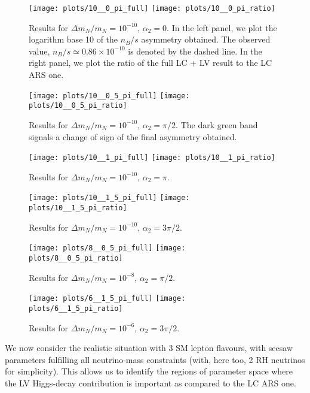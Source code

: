 \documentclass[prd,twocolumn,superscriptaddress,preprintnumbers,nofootinbib,
noshowpacs,groupedaddress]{revtex4-1} %
\begin{document}
\begin{figure*}[p]
\texttt{[image: plots/10\_\_0\_pi\_full]}\qquad\qquad\qquad
\texttt{[image: plots/10\_\_0\_pi\_ratio]}
\caption{Results for $\Delta m_N/m_N = 10^{-10}$, $\alpha_2=0$\label{fig:10_A}. In the left panel, we plot the logarithm base 10 of the $n_B/s$ asymmetry obtained. The observed value, $n_B/s \simeq 0.86 \times 10^{-10}$ is denoted by the dashed line. In the right panel, we plot the ratio of the full LC + LV result to the LC ARS one.}
\end{figure*}
\begin{figure*}[p]
\texttt{[image: plots/10\_\_0\_5\_pi\_full]}\qquad\qquad\qquad
\texttt{[image: plots/10\_\_0\_5\_pi\_ratio]}
\caption{Results for $\Delta m_N/m_N = 10^{-10}$, $\alpha_2=\pi/2$. The dark green band signals a change of sign of the final asymmetry obtained.}
\end{figure*}
\begin{figure*}[p]
\texttt{[image: plots/10\_\_1\_pi\_full]}\qquad\qquad\qquad
\texttt{[image: plots/10\_\_1\_pi\_ratio]}
\caption{Results for $\Delta m_N/m_N = 10^{-10}$, $\alpha_2=\pi$.}
\end{figure*}


\begin{figure*}[p]
\texttt{[image: plots/10\_\_1\_5\_pi\_full]}\qquad\qquad\qquad
\texttt{[image: plots/10\_\_1\_5\_pi\_ratio]}
\caption{Results for $\Delta m_N/m_N = 10^{-10}$, $\alpha_2=3 \pi/2$.\label{fig:10_D}}
\end{figure*}


\begin{figure*}[p]
\texttt{[image: plots/8\_\_0\_5\_pi\_full]}\qquad\qquad\qquad
\texttt{[image: plots/8\_\_0\_5\_pi\_ratio]}
\caption{Results for $\Delta m_N/m_N = 10^{-8}$, $\alpha_2=\pi/2$.\label{fig:8}}
\end{figure*}
\begin{figure*}[p]
\texttt{[image: plots/6\_\_1\_5\_pi\_full]}\qquad\qquad\qquad
\texttt{[image: plots/6\_\_1\_5\_pi\_ratio]}
\caption{Results for $\Delta m_N/m_N = 10^{-6}$, $\alpha_2=3 \pi/2$\label{fig:6}.}
\end{figure*}

We now consider the realistic situation with 3 SM lepton flavours, with seesaw parameters fulfilling all neutrino-mass constraints (with, here too, 2 RH neutrinos for simplicity). This allows us to identify the regions of parameter space where the LV Higgs-decay contribution is important as compared to the LC ARS one.
\end{document}
